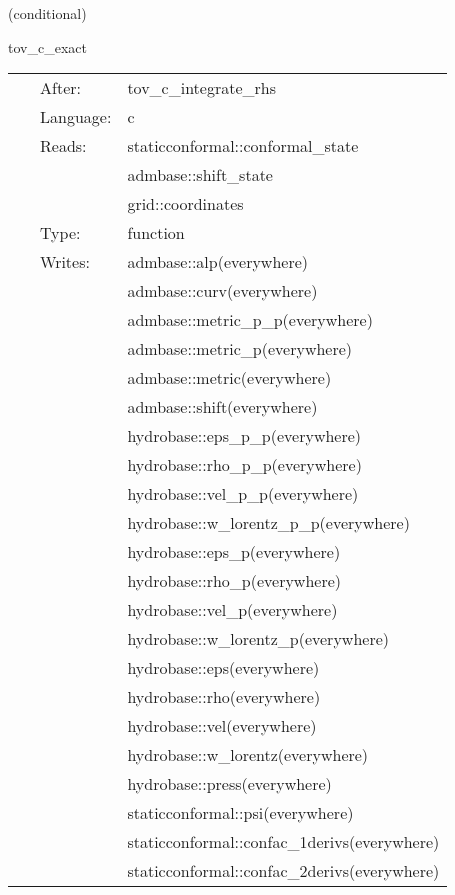 \vspace{5mm}

   (conditional) 

\hspace{5mm} tov\_c\_exact 

\hspace{5mm}{\it set up the 3d quantities for the tov star } 


\hspace{5mm}

 \begin{tabular*}{160mm}{cll} 
~ & After:  & tov\_c\_integrate\_rhs \\ 
~ & Language:  & c \\ 
~ & Reads:  & staticconformal::conformal\_state \\ 
~& ~ &admbase::shift\_state\\ 
~& ~ &grid::coordinates\\ 
~ & Type:  & function \\ 
~ & Writes:  & admbase::alp(everywhere) \\ 
~& ~ &admbase::curv(everywhere)\\ 
~& ~ &admbase::metric\_p\_p(everywhere)\\ 
~& ~ &admbase::metric\_p(everywhere)\\ 
~& ~ &admbase::metric(everywhere)\\ 
~& ~ &admbase::shift(everywhere)\\ 
~& ~ &hydrobase::eps\_p\_p(everywhere)\\ 
~& ~ &hydrobase::rho\_p\_p(everywhere)\\ 
~& ~ &hydrobase::vel\_p\_p(everywhere)\\ 
~& ~ &hydrobase::w\_lorentz\_p\_p(everywhere)\\ 
~& ~ &hydrobase::eps\_p(everywhere)\\ 
~& ~ &hydrobase::rho\_p(everywhere)\\ 
~& ~ &hydrobase::vel\_p(everywhere)\\ 
~& ~ &hydrobase::w\_lorentz\_p(everywhere)\\ 
~& ~ &hydrobase::eps(everywhere)\\ 
~& ~ &hydrobase::rho(everywhere)\\ 
~& ~ &hydrobase::vel(everywhere)\\ 
~& ~ &hydrobase::w\_lorentz(everywhere)\\ 
~& ~ &hydrobase::press(everywhere)\\ 
~& ~ &staticconformal::psi(everywhere)\\ 
~& ~ &staticconformal::confac\_1derivs(everywhere)\\ 
~& ~ &staticconformal::confac\_2derivs(everywhere)\\ 
\end{tabular*} 


